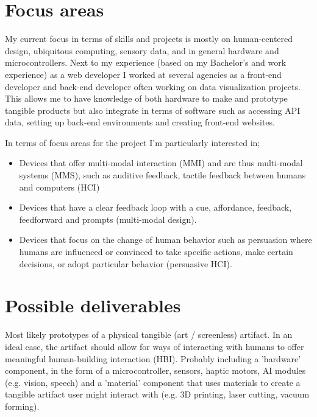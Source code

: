 \section{Focus areas}

My current focus in terms of skills and projects is mostly on human-centered design, ubiquitous computing, sensory data, and in general hardware and microcontrollers. Next to my experience (based on my Bachelor's and work experience) as a web developer I worked at several agencies as a front-end developer and back-end developer often working on data visualization projects. This allows me to have knowledge of both hardware to make and prototype tangible products but also integrate in terms of software such as accessing API data, setting up back-end environments and creating front-end websites.

In terms of focus areas for the project I'm particularly interested in;

\begin{itemize}
  \item Devices that offer multi-modal interaction (MMI) and are thus multi-modal systems (MMS), such as auditive feedback, tactile feedback between humans and computers (HCI)
  \item Devices that have a clear feedback loop with a cue, affordance, feedback, feedforward and prompts (multi-modal design).
  \item Devices that focus on the change of human behavior such as persuasion where humans are influenced or convinced to take specific actions, make certain decisions, or adopt particular behavior (persuasive HCI).
\end{itemize}

\section{Possible deliverables}

Most likely prototypes of a physical tangible (art / screenless) artifact. In an ideal case, the artifact should allow for ways of interacting with humans to offer meaningful human-building interaction (HBI). Probably including a 'hardware' component, in the form of a microcontroller, sensors, haptic motors, AI modules (e.g. vision, speech) and a 'material' component that uses materials to create a tangible artifact user might interact with (e.g. 3D printing, laser cutting, vacuum forming).